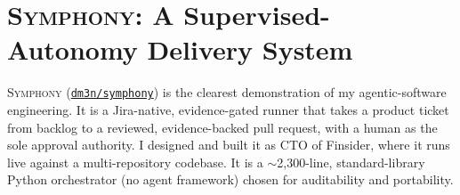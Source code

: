 \documentclass[11pt]{article}
\theoremstyle{plain}
\theoremstyle{definition}
\newcommand{\repo}[1]{\href{https://github.com/dm3n/#1}{\nolinkurl{dm3n/#1}}}
\begin{document}
\section{\textsc{Symphony}: A Supervised-Autonomy Delivery System}
\textsc{Symphony} (\repo{symphony}) is the clearest demonstration of my agentic-software
engineering. It is a Jira-native, evidence-gated runner that takes a product ticket from
backlog to a reviewed, evidence-backed pull request, with a human as the sole approval
authority. I designed and built it as CTO of Finsider, where it runs live against a
multi-repository codebase. It is a $\sim$2{,}300-line, standard-library Python orchestrator
(no agent framework) chosen for auditability and portability.
\end{document}
